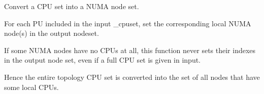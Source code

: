 Convert a C\+PU set into a N\+U\+MA node set. 

For each PU included in the input {\ttfamily \+\_\+cpuset}, set the corresponding local N\+U\+MA node(s) in the output {\ttfamily nodeset}.

If some N\+U\+MA nodes have no C\+P\+Us at all, this function never sets their indexes in the output node set, even if a full C\+PU set is given in input.

Hence the entire topology C\+PU set is converted into the set of all nodes that have some local C\+P\+Us. 